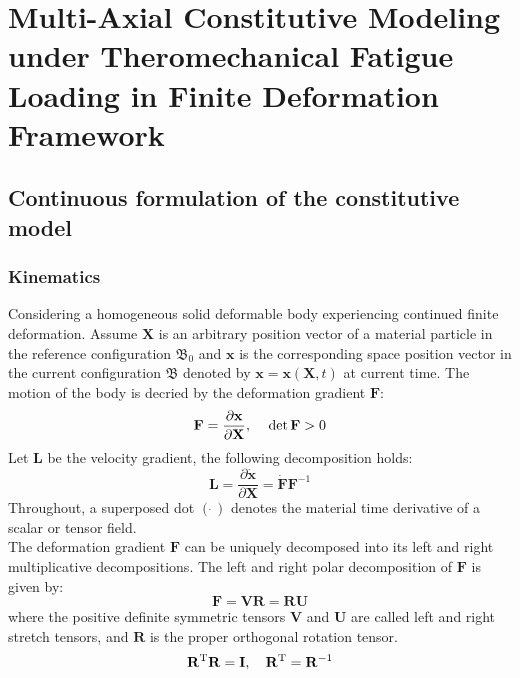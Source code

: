 \chapter{Multi-Axial Constitutive Modeling under Theromechanical Fatigue Loading in Finite Deformation Framework}

\section{Continuous formulation of the constitutive model}
\label{}
\subsection{Kinematics}
Considering a homogeneous solid deformable body experiencing continued finite deformation.
Assume $\mathbf{X}$ is an arbitrary position vector of a material particle in the reference configuration $\mathfrak{B_0}$ and $\mathbf{x}$ is the corresponding space position vector in the current configuration $\mathfrak{B}$ denoted by $\mathbf{x}=\mathbf{x}\left(\mathbf{X},t\right)$ at current time.
The motion of the body is decried by the deformation gradient $\mathbf{F}$:
\begin{equation}
{\mathbf{F}} = \frac{{\partial {\mathbf{x}}}}{{\partial {\mathbf{X}}}}, \rm{\quad} \det {\mathbf{F}}>0
\end{equation}
Let $\mathbf{L}$ be the velocity gradient, the following decomposition holds:
\begin{equation}
{\mathbf{L}} = \frac{{\partial {\mathbf{\dot x}}}}{{\partial {\mathbf{X}}}} = {\mathbf{\dot F}}{{\mathbf{F}}^{ - 1}}
\end{equation}
Throughout, a superposed dot $\left(\dot{\ }\right)$ denotes the material time derivative of a scalar or tensor field.\\
The deformation gradient $\mathbf{F}$ can be uniquely decomposed into its left and right multiplicative decompositions.
The left and right polar decomposition of $\mathbf{F}$ is given by:
\begin{equation}
{\mathbf{F}} = {\mathbf{VR}} = {\mathbf{RU}}
\end{equation}
where the positive definite symmetric tensors $\mathbf{V}$ and $\mathbf{U}$ are called left and right stretch tensors, and $\mathbf{R}$ is the proper orthogonal rotation tensor.
\begin{equation}
{{\mathbf{R}}^{\rm{T}}} {\mathbf{R}} = {\mathbf{I}}, \rm{\quad} {{\mathbf{R}}^{\rm{T}}} = {{\mathbf{R}}^{ - 1}}
\end{equation}
